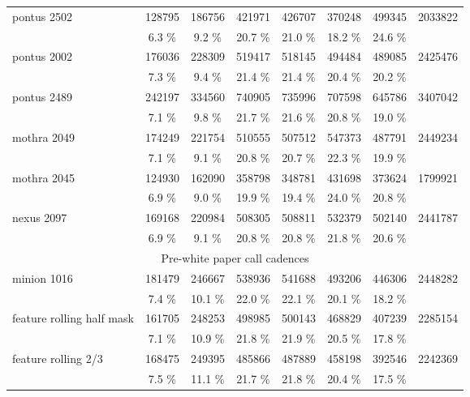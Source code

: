\begin{appendices}
\begin{longtable}{l|ccccccc}
\hline
         pontus 2502 &  128795 &  186756 &  421971 &  426707 &  370248 &  499345 &  2033822 \\ 
                     &    6.3 \% &    9.2 \% &   20.7 \% &   21.0 \% &   18.2 \% &   24.6 \% & \\
\hline
         pontus 2002 &  176036 &  228309 &  519417 &  518145 &  494484 &  489085 &  2425476 \\ 
                     &    7.3 \% &    9.4 \% &   21.4 \% &   21.4 \% &   20.4 \% &   20.2 \% & \\
\hline
         pontus 2489 &  242197 &  334560 &  740905 &  735996 &  707598 &  645786 &  3407042 \\ 
                     &    7.1 \% &    9.8 \% &   21.7 \% &   21.6 \% &   20.8 \% &   19.0 \% & \\
\hline
         mothra 2049 &  174249 &  221754 &  510555 &  507512 &  547373 &  487791 &  2449234 \\ 
                     &    7.1 \% &    9.1 \% &   20.8 \% &   20.7 \% &   22.3 \% &   19.9 \% & \\
\hline
         mothra 2045 &  124930 &  162090 &  358798 &  348781 &  431698 &  373624 &  1799921 \\ 
                     &    6.9 \% &    9.0 \% &   19.9 \% &   19.4 \% &   24.0 \% &   20.8 \% & \\
\hline
          nexus 2097 &  169168 &  220984 &  508305 &  508811 &  532379 &  502140 &  2441787 \\ 
                     &    6.9 \% &    9.1 \% &   20.8 \% &   20.8 \% &   21.8 \% &   20.6 \% & \\
\hline
\hline
\multicolumn{8}{c}{Pre-white paper call cadences}\\
\hline
         minion 1016 &  181479 &  246667 &  538936 &  541688 &  493206 &  446306 &  2448282 \\ 
                     &    7.4 \% &   10.1 \% &   22.0 \% &   22.1 \% &   20.1 \% &   18.2 \% & \\
\hline
feature rolling half mask &  161705 &  248253 &  498985 &  500143 &  468829 &  407239 &  2285154 \\ 
                     &    7.1 \% &   10.9 \% &   21.8 \% &   21.9 \% &   20.5 \% &   17.8 \% & \\
\hline
 feature rolling 2/3 &  168475 &  249395 &  485866 &  487889 &  458198 &  392546 &  2242369 \\ 
                     &    7.5 \% &   11.1 \% &   21.7 \% &   21.8 \% &   20.4 \% &   17.5 \% & \\

\end{longtable}
\end{appendices}
